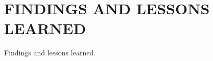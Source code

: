 \section{FINDINGS AND LESSONS LEARNED}
\label{sec:conclusion}

Findings and lessons learned.








